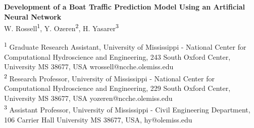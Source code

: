 \documentclass[
10pt, %
letterpaper, %
twoside, %
headinclude,footinclude, %
BCOR5mm, %
]{scrartcl}
\author{\large{W. Rossell$^1$, Y. Ozeren$^2$, H. Yasarer$^3$}} %
\date{} %
\def\SP#1{\textsuperscript{\textcolor{black}{#1}}}
\begin{document}
	\begin{singlespace}
\begin{center}	
	
\textbf{\huge{Development of a Boat Traffic Prediction Model Using an Artificial Neural Network}}\\
\vspace{1cm}
\large{W. Rossell\SP{1}, Y. Ozeren\SP{2}, H. Yasarer\SP{3}}
\vspace{1cm}





\renewcommand{\sectionmark}[1]{\markright{\normalfont{#1}}} %
\renewcommand{\subsectionmark}[1]{\markright{\thesubsection~#1}} %
\lehead{\mbox{\llap{\small\thepage\kern1em\color{halfgray} \vline}\color{halfgray}\hspace{0.5em}\bfseries\rightmark\hfil}} %

\pagestyle{scrheadings} %

	
	\normalsize \SP{1} Graduate Research Assistant, University of Mississippi - National Center for Computational Hydroscience and Engineering, 243 South Oxford Center, University MS 38677, USA wrossell@ncche.olemiss.edu \\\SP{2} Research Professor, University of Mississippi - National Center for Computational Hydroscience and Engineering, 229 South Oxford Center, University MS 38677, USA yozeren@ncche.olemiss.edu 
	\\\SP{3} Assistant Professor, University of Mississippi - Civil Engineering Department, 106 Carrier Hall University MS 38677, USA, hy@olemiss.edu\\	
		

\end{center}
\end{singlespace}
\end{document}
